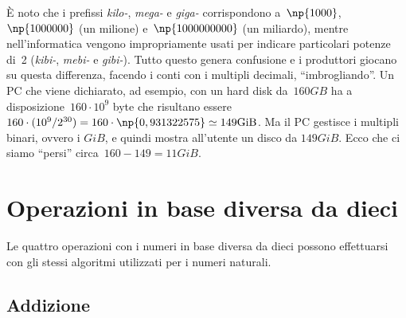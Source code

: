 \osservazione È noto che i prefissi \textit{kilo-}, \textit{mega-} e \textit{giga-}
corrispondono a~$\np{1000}$, $\np{1000000}$ (un milione) e~$\np{1000000000}$ (un
miliardo), mentre nell'informatica vengono
impropriamente usati per indicare particolari potenze di~2 (\textit{kibi-}, \textit{mebi-} e \textit{gibi-}).
Tutto questo genera confusione e i produttori giocano su questa
differenza, facendo i conti con i multipli decimali, ``imbrogliando''. Un PC che
viene dichiarato, ad esempio, con un hard disk da~$160\unit{GB}$ ha a disposizione~$160\cdot 10^{9}$ byte che risultano essere $160\cdot(10^9 / 2^{30}) = 160 \cdot \np{0,931322575} \simeq 149\unit{GiB}$\@. Ma il PC gestisce i multipli binari, ovvero i $\unit{GiB}$, e quindi mostra all'utente un disco da $149\unit{GiB}$\@. Ecco che ci siamo ``persi'' circa~$160-149=11\unit{GiB}$.

\vspazio\ovalbox{\risolvi \ref{ese:4.20}}

\section{Operazioni in base diversa da dieci}

Le quattro operazioni con i numeri in base diversa da dieci possono
effettuarsi con gli stessi algoritmi utilizzati per i numeri naturali.

\subsection{Addizione}

